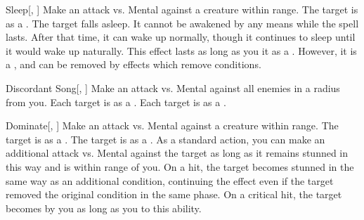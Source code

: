 \lowercase{\hypertarget{spell:Sleep}{}}\label{spell:Sleep}
\begin{ability}[\nth{3}]{\hypertarget{spell:Sleep}{Sleep}}[, ]
Make an attack vs. Mental against a creature within \rngclose range.
\hit The target is \blinded as a .
\crit The target falls asleep.
It cannot be awakened by any means while the spell lasts.
After that time, it can wake up normally, though it continues to sleep until it would wake up naturally.
This effect lasts as long as you  it as a .
However, it is a , and can be removed by effects which remove conditions.
\end{ability}
\vspace{0.25em}



\lowercase{\hypertarget{spell:Discordant Song}{}}\label{spell:Discordant Song}
\begin{ability}[\nth{4}]{\hypertarget{spell:Discordant Song}{Discordant Song}}[, ]
Make an attack vs. Mental against all enemies in a \areamed radius from you.
\hit Each target is \disoriented as a .
\crit Each target is \confused as a .
\end{ability}
\vspace{0.25em}



\lowercase{\hypertarget{spell:Dominate}{}}\label{spell:Dominate}
\begin{ability}[\nth{4}]{\hypertarget{spell:Dominate}{Dominate}}[, ]
Make an attack vs. Mental against a creature within \rngmed range.
\hit The target is  as a .
\crit The target is  as a .
As a standard action, you can make an additional attack vs. Mental against the target as long as it remains stunned in this way and is within \rngmed range of you.
On a hit, the target becomes stunned in the same way as an additional condition, continuing the effect even if the target removed the original condition in the same phase.
On a critical hit, the target becomes  by you as long as you  to this ability.
\end{ability}
\vspace{0.25em}



